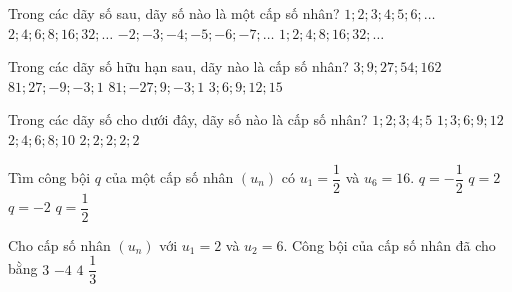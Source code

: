 \begin{ex}%
	Trong các dãy số sau, dãy số nào là một  cấp số nhân?
	\choice 
		{$1;  2; 3; 4; 5; 6; \ldots$}
		{$2; 4; 6; 8;  16; 32; \ldots$}
		{$-2;  -3; -4; -5; -6; -7; \ldots$}
		{\True $1; 2; 4; 8; 16;  32; \ldots$}
\end{ex}

\begin{ex}%
	Trong các dãy số  hữu hạn sau, dãy nào là cấp số nhân?
	 \choice
		 {$3; 9; 27; 54; 162$}
		{$81; 27; -9; -3; 1$} 
		 {\True $81; -27; 9; -3; 1$}
		{$3; 6;  9; 12; 15$}
\end{ex}

\begin{ex}%
	Trong các dãy  số cho dưới đây, dãy số nào là cấp số nhân?
	\choice 
		 {$1; 2; 3; 4; 5$}
		{$1; 3;  6; 9; 12$}
		{$2;  4; 6; 8; 10$}
		{\True $2; 2; 2;  2; 2$}
\end{ex}

\begin{ex}%
	Tìm công bội $q$ của một  cấp số nhân $\left(u_n\right)$ có $u_1=\dfrac{1}{2}$ và $u_6=16$.
	 \choice
		 {$q=-\dfrac{1}{2}$}
		{\True $q=2$} 
		{$q=-2$} 
		 {$q=\dfrac{1}{2}$}
\end{ex}

\begin{ex}%
	Cho cấp số nhân $\left(u_n\right)$ với $u_1=2$ và $u_2=6$. Công bội của cấp số nhân đã cho bằng 
	\choice 
		{\True  $3$}
		 {$-4$}
		 {$4$}
		 {$\dfrac{1}{3}$}
\end{ex}

